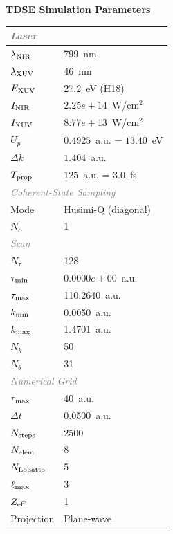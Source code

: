 \documentclass[11pt]{article}
\begin{document}

\begin{center}
  \Large\textbf{TDSE Simulation Parameters}
\end{center}
\vspace{4pt}

\begin{tabular}{@{}ll@{}}
  \toprule
  \multicolumn{2}{l}{\small\textit{\textcolor{gray}{Laser}}} \\
  \hline
  $\lambda_{\rm NIR}$ & 799~nm \\
  $\lambda_{\rm XUV}$ & 46~nm \\
  $E_{\rm XUV}$ & 27.2~eV (H18) \\
  $I_{\rm NIR}$ & $2.25e+14$~W/cm$^2$ \\
  $I_{\rm XUV}$ & $8.77e+13$~W/cm$^2$ \\
  $U_p$ & $0.4925$~a.u. = $13.40$~eV \\
  $\Delta k$ & $1.404$~a.u. \\
  $T_{\rm prop}$ & $125$~a.u. = $3.0$~fs \\
  \multicolumn{2}{l}{\small\textit{\textcolor{gray}{Coherent-State Sampling}}} \\
  \hline
  Mode & Husimi-Q (diagonal) \\
  $N_{\alpha}$ & 1 \\
  \multicolumn{2}{l}{\small\textit{\textcolor{gray}{Scan}}} \\
  \hline
  $N_{\tau}$ & 128 \\
  $\tau_{\rm min}$ & $0.0000e+00$~a.u. \\
  $\tau_{\rm max}$ & 110.2640~a.u. \\
  $k_{\rm min}$ & 0.0050~a.u. \\
  $k_{\rm max}$ & 1.4701~a.u. \\
  $N_k$ & 50 \\
  $N_{\theta}$ & 31 \\
  \multicolumn{2}{l}{\small\textit{\textcolor{gray}{Numerical Grid}}} \\
  \hline
  $r_{\rm max}$ & 40~a.u. \\
  $\Delta t$ & 0.0500~a.u. \\
  $N_{\rm steps}$ & 2500 \\
  $N_{\rm elem}$ & 8 \\
  $N_{\rm Lobatto}$ & 5 \\
  $\ell_{\rm max}$ & 3 \\
  $Z_{\rm eff}$ & 1 \\
  Projection & Plane-wave \\
  \bottomrule
\end{tabular}
\end{document}
